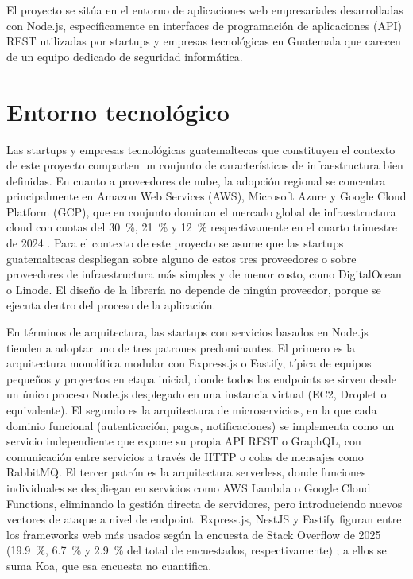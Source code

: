 El proyecto se sitúa en el entorno de aplicaciones web empresariales desarrolladas con
Node.js, específicamente en interfaces de programación de aplicaciones (API) REST utilizadas por startups y empresas tecnológicas en
Guatemala que carecen de un equipo dedicado de seguridad informática.

\section*{Entorno tecnológico}

Las startups y empresas tecnológicas guatemaltecas que constituyen el contexto de este
proyecto comparten un conjunto de características de infraestructura bien definidas. En
cuanto a proveedores de nube, la adopción regional se concentra principalmente en Amazon
Web Services (AWS), Microsoft Azure y Google Cloud Platform (GCP), que en conjunto dominan
el mercado global de infraestructura cloud con cuotas del 30~\%, 21~\% y 12~\% respectivamente en el cuarto trimestre de 2024 \cite{synergy2025cloud}. Para el contexto de este proyecto se asume que las startups guatemaltecas despliegan sobre alguno de
estos tres proveedores o sobre proveedores de infraestructura más simples y de menor costo, como
DigitalOcean o Linode. El diseño de la librería no depende de ningún proveedor, porque se ejecuta
dentro del proceso de la aplicación.

En términos de arquitectura, las startups con servicios basados en Node.js tienden a
adoptar uno de tres patrones predominantes. El primero es la arquitectura monolítica
modular con Express.js o Fastify, típica de equipos pequeños y proyectos en etapa inicial,
donde todos los endpoints se sirven desde un único proceso Node.js desplegado en una
instancia virtual (EC2, Droplet o equivalente). El segundo es la arquitectura de
microservicios, en la que cada dominio funcional (autenticación, pagos, notificaciones) se
implementa como un servicio independiente que expone su propia API REST o GraphQL, con
comunicación entre servicios a través de HTTP o colas de mensajes como RabbitMQ. El tercer patrón es la arquitectura serverless, donde funciones individuales se despliegan en servicios como AWS Lambda o
Google Cloud Functions, eliminando la gestión directa de servidores, pero introduciendo
nuevos vectores de ataque a nivel de endpoint. Express.js, NestJS y Fastify figuran entre los frameworks web más usados según la encuesta de Stack
Overflow de 2025 (19.9~\%, 6.7~\% y 2.9~\% del total de encuestados, respectivamente)
\cite{stackoverflow2025survey}; a ellos se suma Koa, que esa encuesta no cuantifica.


